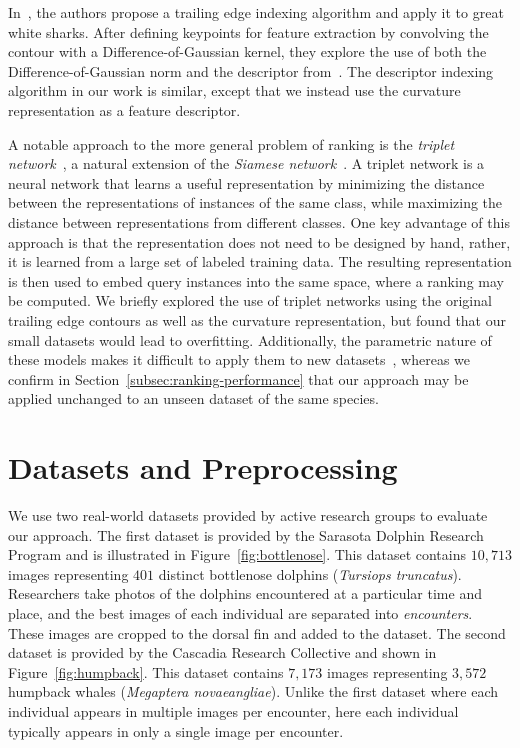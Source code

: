 \documentclass[10pt,twocolumn,letterpaper]{article}
\begin{document}
In~\cite{Hughes16}, the authors propose a trailing edge indexing algorithm and
apply it to great white sharks.  After defining keypoints for feature
extraction by convolving the contour with a Difference-of-Gaussian kernel, they
explore the use of both the Difference-of-Gaussian norm and the descriptor
from~\cite{Arandjelovic12}.  The descriptor indexing algorithm in our work is
similar, except that we instead use the curvature representation as a feature
descriptor.

A notable approach to the more general problem of ranking is the \emph{triplet
network}~\cite{Hoffer15, Wang14}, a natural extension of the \emph{Siamese
network}~\cite{Taigman14, Chopra05}.  A triplet network is a neural network that learns
a useful representation by minimizing the distance between the representations
of instances of the same class, while maximizing the distance between
representations from different classes.  One key advantage of this approach is
that the representation does not need to be designed by hand, rather, it is
learned from a large set of labeled training data.  The resulting
representation is then used to embed query instances into the same space, where
a ranking may be computed.  We briefly explored the use of triplet networks
using the original trailing edge contours as well as the curvature
representation, but found that our small datasets
would lead to overfitting.  Additionally, the parametric nature of these models
makes it difficult to apply them to new datasets~\cite{Yosinski14}, whereas we confirm in
Section~\ref{subsec:ranking-performance} that our approach may be applied
unchanged to an unseen dataset of the same species.

\section{Datasets and Preprocessing}
\label{section:datasets}
We use two real-world datasets provided by active research groups to evaluate
our approach.  The first dataset is provided by the Sarasota Dolphin Research
Program and is illustrated in Figure~\ref{fig:bottlenose}.  This dataset
contains $10,\!713$ images representing $401$ distinct bottlenose dolphins
(\emph{Tursiops truncatus}).  Researchers take photos of the dolphins
encountered at a particular time and place, and the best images of each
individual are separated into \emph{encounters}.  These images are cropped to
the dorsal fin and added to the dataset.  The second dataset is provided by the
Cascadia Research Collective and shown in Figure~\ref{fig:humpback}.  This
dataset contains $7,\!173$ images representing $3,\!572$ humpback whales
(\emph{Megaptera novaeangliae}).  Unlike the first dataset where each
individual appears in multiple images per encounter, here each individual
typically appears in only a single image per encounter.  
\end{document}
